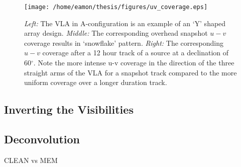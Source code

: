 \begin{figure}[hbt!]
\centering 
          \texttt{[image: /home/eamon/thesis/figures/uv\_coverage.eps]}
\caption[VLA antenna layout and two examples of $u-v$ coverage for different track lengths.]{\textit{Left:} The VLA in A-configuration is an example of an `Y' shaped array design. \textit{Middle:} The corresponding overhead snapshot $u-v$ coverage results in `snowflake' pattern. \textit{Right:} The corresponding $u-v$ coverage after a 12 hour track of a source at a declination of 60$^{\circ}$. Note the more intense u-v coverage in the direction of the three straight arms of the VLA for a snapshot track compared to the more uniform coverage over a longer duration track.}
\label{fig2i}
\end{figure}

\subsection{Inverting the Visibilities}\label{subsec:x}
\subsection{Deconvolution}\label{subsec:x}
CLEAN vs MEM